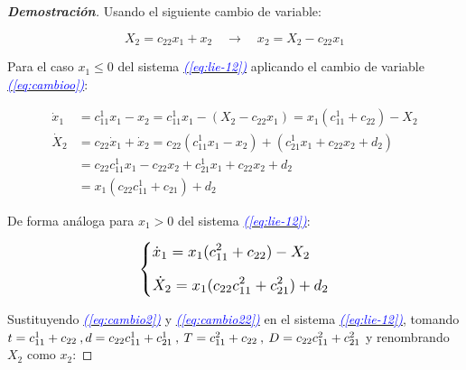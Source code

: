 \documentclass[12pt,a4paper]{report} %
\newcommand{\eref}[1]{\hyperref[#1]{\textcolor{blue}{\textit{(\ref*{#1})}}}}
\begin{document}
	\begin{proof}[\textbf{Demostración}]
	Usando el siguiente cambio de variable:
	
	\begin{equation}
		\label{eq:cambioo}
		X_2=c_{22}x_1+x_2\quad \rightarrow \quad x_2=X_2-c_{22}x_1
	\end{equation}\smallskip
	
	\noindent Para el caso $x_1\leq 0$ del sistema \eref{eq:lie-12} aplicando el cambio de variable \eref{eq:cambioo}:
	
		\begin{equation}
		\label{eq:cambio2}
		\begin{aligned}
			\dot{x}_1&=c_{11}^1x_1-x_2=c_{11}^1x_1-(X_2-c_{22}x_1)=x_1(c_{11}^1+c_{22})-X_2 \\[2mm]
			\dot{X}_2&=c_{22}\dot{x}_1+\dot{x}_2=c_{22}(c_{11}^1x_1-x_2)+(c_{21}^1x_1+c_{22}x_2+d_2) \\[2mm]
			&=c_{22}c_{11}^1x_1-c_{22}x_2+c_{21}^1x_1+c_{22}x_2+d_2 \\[2mm]
			&=x_1(c_{22}c_{11}^1+c_{21})+d_2
		\end{aligned}
		\end{equation}\smallskip
	
	\noindent De forma análoga para $x_1>0$ del sistema \eref{eq:lie-12}:
	
	\begin{equation}
		\label{eq:cambio22}
		\scalebox{1.2}{$\displaystyle
			\left\{
			\begin{aligned}
				&\dot{x}_1=x_1(c_{11}^2+c_{22})-X_2 \\[2mm]
				&\dot{X}_2=x_1(c_{22}c_{11}^2+c_{21}^2)+d_2
			\end{aligned}
			\right.
			$}
	\end{equation}\smallskip
	
 	\noindent Sustituyendo \eref{eq:cambio2} y \eref{eq:cambio22} en el sistema \eref{eq:lie-12}, tomando $t=c_{11}^1+c_{22} \: , \:\\ d=c_{22}c_{11}^1+c_{21}^1 \: , \:  T=c_{11}^2+c_{22} \: , \: D=c_{22}c_{11}^2+c_{21}^2$ y renombrando $X_2$ como $x_2$:
	

\end{proof}
\end{document}
